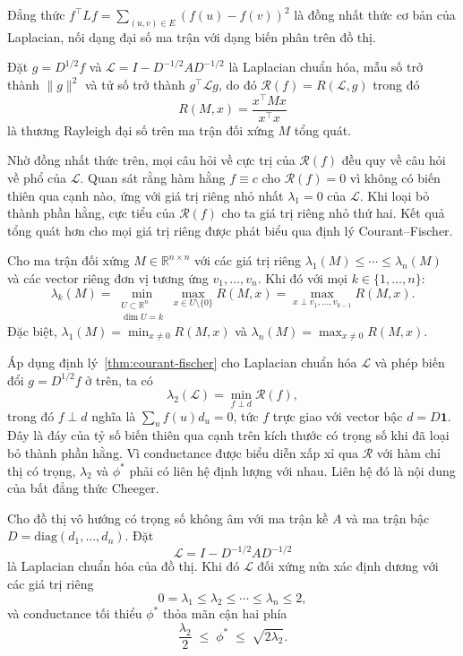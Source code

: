 Đẳng thức $f^\top L f = \sum_{(u,v) \in E} (f(u) - f(v))^2$ là đồng nhất thức cơ bản của Laplacian, nối dạng đại số ma trận với dạng biến phân trên đồ thị.

Đặt $g = D^{1/2} f$ và $\mathcal{L} = I - D^{-1/2} A D^{-1/2}$ là Laplacian chuẩn hóa, mẫu số trở thành $\|g\|^2$ và tử số trở thành $g^\top \mathcal{L} g$, do đó $\mathcal{R}(f) = R(\mathcal{L}, g)$ trong đó
\[
    R(M, x) = \frac{x^\top M x}{x^\top x}
\]
là thương Rayleigh đại số trên ma trận đối xứng $M$ tổng quát.

Nhờ đồng nhất thức trên, mọi câu hỏi về cực trị của $\mathcal{R}(f)$ đều quy về câu hỏi về phổ của $\mathcal{L}$. Quan sát rằng hàm hằng $f \equiv c$ cho $\mathcal{R}(f) = 0$ vì không có biến thiên qua cạnh nào, ứng với giá trị riêng nhỏ nhất $\lambda_1 = 0$ của $\mathcal{L}$. Khi loại bỏ thành phần hằng, cực tiểu của $\mathcal{R}(f)$ cho ta giá trị riêng nhỏ thứ hai. Kết quả tổng quát hơn cho mọi giá trị riêng được phát biểu qua định lý Courant--Fischer.

\begin{theorem}
\label{thm:courant-fischer}
Cho ma trận đối xứng $M \in \mathbb{R}^{n \times n}$ với các giá trị riêng $\lambda_1(M) \leq \cdots \leq \lambda_n(M)$ và các vector riêng đơn vị tương ứng $v_1, \ldots, v_n$. Khi đó với mọi $k \in \{1, \ldots, n\}$:
\[
    \lambda_k(M) = \min_{\substack{U \subset \mathbb{R}^n \\ \dim U = k}} \max_{x \in U \setminus \{0\}} R(M, x)
                 = \max_{x \perp v_1, \ldots, v_{k-1}} R(M, x).
\]
Đặc biệt, $\lambda_1(M) = \min_{x \neq 0} R(M, x)$ và $\lambda_n(M) = \max_{x \neq 0} R(M, x)$.
\end{theorem}

Áp dụng định lý~\ref{thm:courant-fischer} cho Laplacian chuẩn hóa $\mathcal{L}$ và phép biến đổi $g = D^{1/2} f$ ở trên, ta có
\[
    \lambda_2(\mathcal{L}) = \min_{f \perp d} \mathcal{R}(f),
\]
trong đó $f \perp d$ nghĩa là $\sum_u f(u) d_u = 0$, tức $f$ trực giao với vector bậc $d = D\mathbf{1}$. Đây là đáy của tỷ số biến thiên qua cạnh trên kích thước có trọng số khi đã loại bỏ thành phần hằng. Vì conductance được biểu diễn xấp xỉ qua $\mathcal{R}$ với hàm chỉ thị có trọng, $\lambda_2$ và $\phi^*$ phải có liên hệ định lượng với nhau. Liên hệ đó là nội dung của bất đẳng thức Cheeger.

\begin{theorem}
\label{thm:cheeger}
Cho đồ thị vô hướng có trọng số không âm với ma trận kề $A$ và ma trận bậc $D = \mathrm{diag}(d_1, \ldots, d_n)$. Đặt
\[
    \mathcal{L} = I - D^{-1/2} A D^{-1/2}
\]
là Laplacian chuẩn hóa của đồ thị. Khi đó $\mathcal{L}$ đối xứng nửa xác định dương với các giá trị riêng
\[
    0 = \lambda_1 \leq \lambda_2 \leq \cdots \leq \lambda_n \leq 2,
\]
và conductance tối thiểu $\phi^*$ thỏa mãn cận hai phía
\[
    \frac{\lambda_2}{2} \;\leq\; \phi^* \;\leq\; \sqrt{2 \lambda_2}.
\]
\end{theorem}

